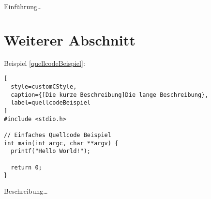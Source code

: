 
Einführung\ldots

\section{Weiterer Abschnitt}

Beispiel \autoref{quellcodeBeispiel}:

\begin{lstlisting}[
  style=customCStyle,
  caption={[Die kurze Beschreibung]Die lange Beschreibung},
  label=quellcodeBeispiel
]
#include <stdio.h>

// Einfaches Quellcode Beispiel
int main(int argc, char **argv) {
  printf("Hello World!");

  return 0;
}
\end{lstlisting}

Beschreibung\ldots
